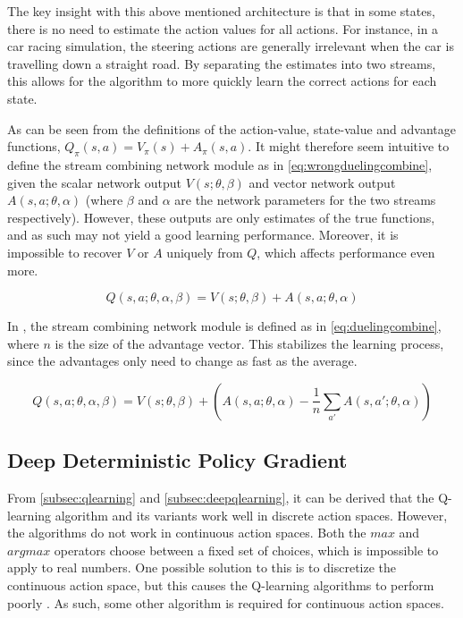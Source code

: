 \documentclass{kththesis}
\begin{document}
The key insight with this above mentioned architecture is that in some states, there is no need to estimate the action values for all actions. For instance, in a car racing simulation, the steering actions are generally irrelevant when the car is travelling down a straight road. By separating the estimates into two streams, this allows for the algorithm to more quickly learn the correct actions for each state. \parencite{wang2015dueling}

As can be seen from the definitions of the action-value, state-value and advantage functions, $Q_\pi(s, a) = V_\pi(s) + A_\pi(s, a)$. It might therefore seem intuitive to define the stream combining network module as in \autoref{eq:wrongduelingcombine}, given the scalar network output $V(s;\theta,\beta)$ and vector network output $A(s, a;\theta, \alpha)$ (where $\beta$ and $\alpha$ are the network parameters for the two streams respectively). However, these outputs are only estimates of the true functions, and as such may not yield a good learning performance. Moreover, it is impossible to recover $V$ or $A$ uniquely from $Q$, which affects performance even more. \parencite{wang2015dueling}

\begin{equation}
\label{eq:wrongduelingcombine}
Q(s,a;\theta,\alpha,\beta) = V(s;\theta,\beta) + A(s, a;\theta, \alpha)
\end{equation}

In \parencite{wang2015dueling}, the stream combining network module is defined as in \autoref{eq:duelingcombine}, where $n$ is the size of the advantage vector. This stabilizes the learning process, since the advantages only need to change as fast as the average. 

\begin{equation}
\label{eq:duelingcombine}
Q(s,a;\theta,\alpha,\beta) = V(s;\theta,\beta) + (A(s, a;\theta, \alpha) - \frac{1}{n}\sum_{a'}A(s, a';\theta, \alpha))
\end{equation}

\subsection{Deep Deterministic Policy Gradient}
From \autoref{subsec:qlearning} and \autoref{subsec:deepqlearning}, it can be derived that the Q-learning algorithm and its variants work well in discrete action spaces. However, the algorithms do not work in continuous action spaces. Both the $max$ and $argmax$ operators choose between a fixed set of choices, which is impossible to apply to real numbers. One possible solution to this is to discretize the continuous action space, but this causes the Q-learning algorithms to perform poorly \parencite{lillicrap2015continuous}. As such, some other algorithm is required for continuous action spaces.
\end{document}
